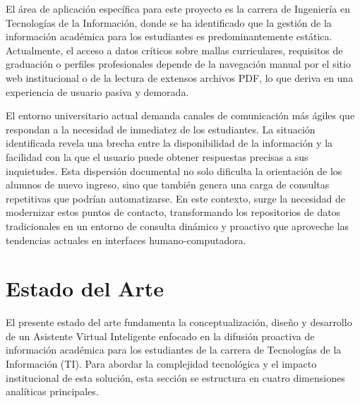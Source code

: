  El área de aplicación específica para este proyecto es la carrera de Ingeniería en Tecnologías de la Información, donde se ha identificado que la gestión de la información académica para los estudiantes es predominantemente estática. Actualmente, el acceso a datos críticos sobre mallas curriculares, requisitos de graduación o perfiles profesionales depende de la navegación manual por el sitio web institucional o de la lectura de extensos archivos PDF, lo que deriva en una experiencia de usuario pasiva y demorada.

El entorno universitario actual demanda canales de comunicación más ágiles que respondan a la necesidad de inmediatez de los estudiantes. La situación identificada revela una brecha entre la disponibilidad de la información y la facilidad con la que el usuario puede obtener respuestas precisas a sus inquietudes. Esta dispersión documental no solo dificulta la orientación de los alumnos de nuevo ingreso, sino que también genera una carga de consultas repetitivas que podrían automatizarse. En este contexto, surge la necesidad de modernizar estos puntos de contacto, transformando los repositorios de datos tradicionales en un entorno de consulta dinámico y proactivo que aproveche las tendencias actuales en interfaces humano-computadora.




\section{Estado del Arte}

El presente estado del arte fundamenta la conceptualización, diseño y desarrollo de un Asistente Virtual Inteligente enfocado en la difusión proactiva de información académica para los estudiantes de la carrera de Tecnologías de la Información (TI). Para abordar la complejidad tecnológica y el impacto institucional de esta solución, esta sección se estructura en cuatro dimensiones analíticas principales.


